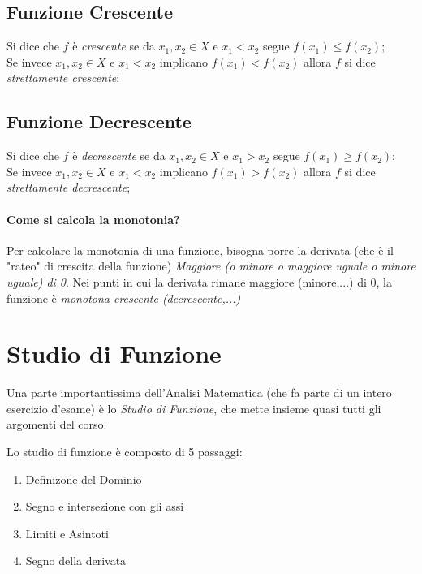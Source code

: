 \documentclass[12pt, a4paper, openany]{book}
\begin{document}
\subsection*{Funzione Crescente}
Si dice che $f$ è \emph{crescente} se da $x_1, x_2 \in X$ e $x_1 < x_2$ segue $f(x_1) \leq f(x_2)$;
\\Se invece $x_1, x_2 \in X$ e $x_1 < x_2$ implicano $f(x_1) < f(x_2)$ allora $f$ si dice \emph{strettamente crescente};

\subsection*{Funzione Decrescente}
Si dice che $f$ è \emph{decrescente} se da $x_1, x_2 \in X$ e $x_1 > x_2$ segue $f(x_1) \geq f(x_2)$;
\\Se invece $x_1, x_2 \in X$ e $x_1 < x_2$ implicano $f(x_1) > f(x_2)$ allora $f$ si dice \emph{strettamente decrescente};

\paragraph{Come si calcola la monotonia?}
Per calcolare la monotonia di una funzione, bisogna porre la derivata (che è il "rateo" di crescita della funzione) \emph{Maggiore (o minore o maggiore uguale o minore uguale) di 0}.
Nei punti in cui la derivata rimane maggiore (minore,...) di 0, la funzione è \emph{monotona crescente (decrescente,...)}


\section{Studio di Funzione}
Una parte importantissima dell'Analisi Matematica (che fa parte di un intero esercizio d'esame) è lo \emph{Studio di Funzione},
che mette insieme quasi tutti gli argomenti del corso.

Lo studio di funzione è composto di 5 passaggi:
\begin{enumerate}
	\item Definizone del Dominio
 \item Segno e intersezione con gli assi
 \item Limiti e Asintoti
 \item Segno della derivata
\end{enumerate}
\end{document}
